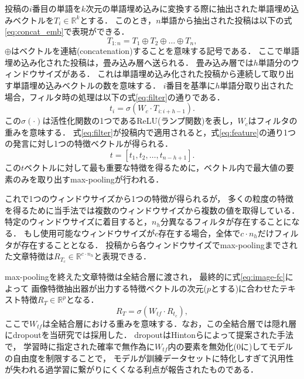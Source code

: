 投稿の$i$番目の単語を$k$次元の単語埋め込みに変換する際に抽出された単語埋め込みベクトルを$T_i \in \mathbb{R}^k$とする．
このとき，$n$単語から抽出された投稿は以下の式\ref{eq:concat_emb}で表現ができる．
\begin{equation}
    \label{eq:concat_emb}
    T_{1:n} = T_1 \oplus T_2 \oplus \ldots \oplus T_n,
\end{equation}
$\oplus$はベクトルを連結(concatenation)することを意味する記号である．
ここで単語埋め込み化された投稿は，畳み込み層へ送られる．
畳み込み層では$h$単語分のウィンドウサイズがある．
これは単語埋め込み化された投稿から連続して取り出す単語埋め込みベクトルの数を意味する．
$i$番目を基準に$h$単語分取り出された場合，フィルタ時の処理は以下の式\ref{eq:filter}の通りである．
\begin{equation}
    \label{eq:filter}
    t_i = \sigma(W_c \cdot T_{i:i+h-1}).
\end{equation}
この$\sigma(\cdot)$は活性化関数の1つであるReLU(ランプ関数)を表し，$W_c$はフィルタの重みを意味する．
式\ref{eq:filter}が投稿内で適用されると，式\ref{eq:feature}の通り1つの発言に対し1つの特徴ベクトルが得られる．
\begin{equation}
    \label{eq:feature}
    t = [t_1, t_2, \ldots, t_{n-h+1}].
\end{equation}
この$t$ベクトルに対して最も重要な特徴を得るために，ベクトル内で最大値の要素のみを取り出すmax-poolingが行われる．

これで1つのウィンドウサイズから1つの特徴が得られるが，
多くの粒度の特徴を得るために当手法では複数のウィンドウサイズから複数の値を取得している．
特定のウィンドウサイズに着目すると，$n_h$分異なるフィルタが存在することになる．
もし使用可能なウィンドウサイズが$c$存在する場合，全体で$c \cdot n_h$だけフィルタが存在することとなる．
投稿から各ウィンドウサイズでmax-poolingまでされた文章特徴は$R_{T_c} \in \mathbb{R}^{c \cdot n_h}$と表現できる．

max-poolingを終えた文章特徴は全結合層に渡され，
最終的に式\ref{eq:image-fc}によって
画像特徴抽出器が出力する特徴ベクトルの次元($p$とする)に合わせたテキスト特徴$R_T \in \mathbb{R}^p$となる．
\begin{equation}
    \label{eq:image-fc}
    R_T = \sigma(W_{tf} \cdot R_{t_c}),
\end{equation}
ここで$W_{tf}$は全結合層における重みを意味する．なお，この全結合層では隠れ層にdropoutを当研究では採用した．
dropoutはHintonらによって提案された手法\cite{JMLR:v15:srivastava14a}で，
学習時に指定された確率で無作為に$W_{tf}$内の要素を無効化(0に)してモデルの自由度を制限することで，
モデルが訓練データセットに特化しすぎて汎用性が失われる過学習に繋がりにくくなる利点が報告されたものである．
%
